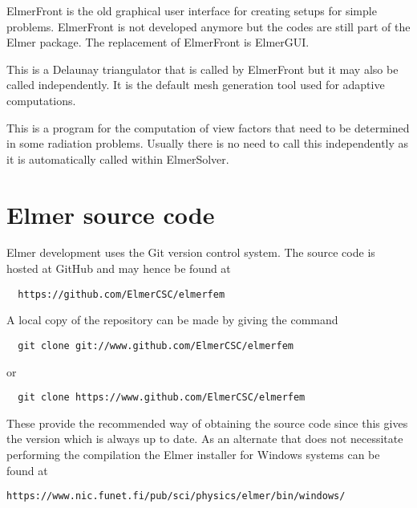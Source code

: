 ElmerFront is the old graphical user interface for creating setups for simple problems. 
ElmerFront is not developed anymore but the codes are still part of the Elmer package.
The replacement of ElmerFront is ElmerGUI. 

This is a Delaunay triangulator that is called by ElmerFront but it may also be called independently.
It is the default mesh generation tool used for adaptive computations.

This is a program for the computation of view factors that need to be determined in some radiation 
problems. Usually there is no need to call this independently as it is automatically called 
within ElmerSolver.
\sifend



\section{Elmer source code}

Elmer development uses the Git version control system. The source code is hosted at GitHub and may hence be found at
\begin{verbatim}
  https://github.com/ElmerCSC/elmerfem
\end{verbatim}
A local copy of the repository can be made by giving the command
\begin{verbatim}
  git clone git://www.github.com/ElmerCSC/elmerfem
\end{verbatim}
or
\begin{verbatim}
  git clone https://www.github.com/ElmerCSC/elmerfem
\end{verbatim}
These provide the recommended way of obtaining the source code since this gives the version which is always up to date. 
As an alternate that does not necessitate performing the compilation
the Elmer installer for Windows systems can be found at
\begin{verbatim}
https://www.nic.funet.fi/pub/sci/physics/elmer/bin/windows/
\end{verbatim}


